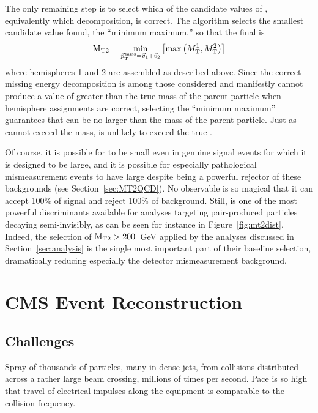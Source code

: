     The only remaining step is to select which of the candidate values of \mttwo, equivalently which \ptvecmiss decomposition, is correct.
    The algorithm selects the smallest candidate \mttwo value found, the ``minimum maximum,'' so that the final \mttwo is
    \begin{equation} \label{eqn:minmax}
      \mathrm{M_{T2}} = \underset{{\vec p}_{\mathrm{T}}^{\kern1pt\text{miss}} = \vec{v}_1+\vec{v}_2}{\min}\left[\max\left(M_{\mathrm{T}}^1,M_{\mathrm{T}}^2\right)\right]
    \end{equation}
    where hemispheres 1 and 2 are assembled as described above.
    Since the correct missing energy decomposition is among those considered and manifestly cannot produce a value of \Mt greater than the true mass of the parent particle when hemisphere assignments are correct, selecting the ``minimum maximum'' guarantees that \mttwo can be no larger than the mass of the parent particle. 
    Just as \Mt cannot exceed the mass, \mttwo is unlikely to exceed the true \Mt.

    Of course, it is possible for \mttwo to be small even in genuine signal events for which it is designed to be large, and it is possible for especially pathological mismeasurement events to have large \mttwo despite \mttwo being a powerful rejector of these backgrounds (see Section~\ref{sec:MT2QCD}).
    No observable is so magical that it can accept 100\% of signal and reject 100\% of background.
    Still, \mttwo is one of the most powerful discriminants available for analyses targeting pair-produced particles decaying semi-invisibly, as can be seen for instance in Figure~\ref{fig:mt2dist}.
    Indeed, the selection of $\mathrm{M_{T2}} > 200$~GeV applied by the analyses discussed in Section~\ref{sec:analysis} is the single most important part of their baseline selection, dramatically reducing especially the detector mismeasurement background.

\section{CMS Event Reconstruction} \label{sec:reconstruction}

  \subsection{Challenges} \label{sec:challenges}

  Spray of thousands of particles, many in dense jets, from collisions distributed across a rather large beam crossing, millions of times per second.
  Pace is so high that travel of electrical impulses along the equipment is comparable to the collision frequency.

